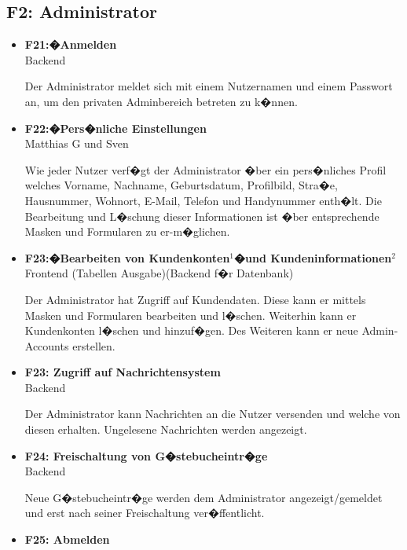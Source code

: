 \documentclass[10pt,a4paper]{scrartcl}
\begin{document}
\subsection{F2: Administrator}
\begin{itemize}
\item[] \textbf{F21:�Anmelden}\\

Backend

Der Administrator meldet sich mit einem Nutzernamen und einem Passwort an, um den privaten Adminbereich betreten zu k�nnen.
	
\item[] \textbf{F22:�Pers�nliche Einstellungen}\\

Matthias G und Sven

Wie jeder Nutzer verf�gt der Administrator �ber ein pers�nliches Profil welches Vorname, Nachname, Geburtsdatum, Profilbild, Stra�e, Hausnummer, Wohnort, E-Mail, Telefon und Handynummer enth�lt. Die Bearbeitung und L�schung dieser Informationen ist �ber entsprechende Masken und Formularen zu er-m�glichen.

\item[] \textbf{F23:�Bearbeiten von Kundenkonten$^1$�und Kundeninformationen$^2$}\\

Frontend (Tabellen Ausgabe)(Backend f�r Datenbank)

Der Administrator hat Zugriff auf Kundendaten. Diese kann er mittels Masken und Formularen bearbeiten und l�schen. Weiterhin kann er Kundenkonten l�schen und hinzuf�gen. Des Weiteren kann er neue Admin-Accounts erstellen.

\item[] \textbf{F23: Zugriff auf Nachrichtensystem}\\

Backend

Der Administrator kann Nachrichten an die Nutzer versenden und welche von diesen erhalten. Ungelesene Nachrichten werden angezeigt. 

\item[] \textbf{F24: Freischaltung von G�stebucheintr�ge}\\

Backend

Neue G�stebucheintr�ge werden dem Administrator angezeigt/gemeldet und erst nach seiner Freischaltung ver�ffentlicht. 
	
\item[] \textbf{F25: Abmelden}\\


\end{itemize}
\end{document}
